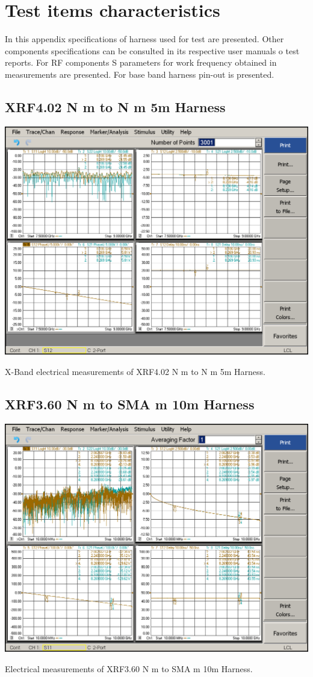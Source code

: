 \section{Test items characteristics} \label{an:items-list-caracteristic}

In this appendix specifications of harness used for test are presented. Other components specifications can be consulted in its respective user manuals o test reports. For RF components S parameters for work frequency obtained in measurements are presented. For base band harness pin-out is presented. \\

\subsection{XRF4.02 N m to N m 5m Harness}

\begin{table}[H]
	\centering
	\includegraphics[width=0.8\linewidth]{figuras/measures/XRF4.02-XB}
	\caption{X-Band electrical measurements of XRF4.02 N m to N m 5m Harness.}
	\label{fig:XRF4.02x}
\end{table}

\subsection{XRF3.60 N m to SMA m 10m Harness}

\begin{table}[H]
	\centering
	\includegraphics[width=0.8\linewidth]{figuras/measures/XRF3.60_MFR 64639 873248-001.png}
	\caption{Electrical measurements of XRF3.60 N m to SMA m 10m Harness.}
	\label{fig:SRF3.60}
\end{table}

